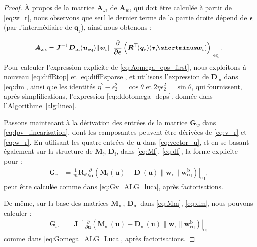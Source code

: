 \begin{proof}
À propos de la matrice $\boldsymbol{A}_{\omega \epsilon}$ de $\boldsymbol{A}_{w}$, qui doit être calculée à partir de \eqref{eq:w_r}, nous observons que seul le dernier terme de la partie droite dépend de $\boldsymbol{\epsilon}$ (par l'intermédiaire de $\boldsymbol{q}_{\mathrm r}$), ainsi nous obtenons :

\begin{align}
\label{eq:Aomega_eps_first}
\boldsymbol{A}_{ \omega \epsilon} =  \boldsymbol{J}^{-1}
\boldsymbol{D}_{\mathrm{m}} (\boldsymbol{u}_{\text{eq}}) \lVert  \boldsymbol{w}_{\mathrm{r}} \rVert 
\left. 
\frac{\partial }{\partial \boldsymbol{\epsilon}} \left( \boldsymbol{R}^\top \!(\boldsymbol{q}_{\mathrm{r}}) (\boldsymbol{v}_{\mathrm{r}} \! \shortminus \! \boldsymbol{w}_{\text{r}}) \right) \right|_{\mathrm{eq}}.
\end{align}
Pour calculer l'expression explicite de \eqref{eq:Aomega_eps_first}, nous exploitons à nouveau \eqref{eq:diffRtop} et \eqref{eq:diffRsparse}, et utilisons l'expression de $\boldsymbol{D}_{\mathrm{m}}$ dans \eqref{eq:dm}, ainsi que les identités $\overline \eta^2 - \overline \epsilon_2^2 = \cos \theta$ et $2\overline \eta \overline \epsilon_2^2 = \sin \theta$, qui fournissent, après simplifications, l'expression \eqref{eq:ddotomega_deps}, donnée dans l'Algorithme~\ref{alg:linea}.

Passons maintenant à la dérivation des entrées de la matrice $\boldsymbol{G}_{w}$ dans \eqref{eq:lpv_linearisation}, dont les composantes peuvent être dérivées de \eqref{eq:v_r} et \eqref{eq:w_r}. En utilisant les quatre entrées de $\boldsymbol{u}$ dans \eqref{eq:vector_u}, et en se basant également sur la structure de $\boldsymbol{M}_{\text{f}}$,
$\boldsymbol{D}_{\text{f}}$, dans \eqref{eq:Mf}, \eqref{eq:df}, la forme explicite pour :
\begin{align}
    \boldsymbol{G}_{v} \! &= \! 
    \frac{1}{m} \boldsymbol{R}_\theta \! \left.\frac{\partial}{\partial \boldsymbol{u}} \! 
     \left( \boldsymbol{M}_{\text{f}}(\boldsymbol{u}) \! - \! \boldsymbol{D}_{\text{f}}(\boldsymbol{u}) \lVert \boldsymbol{w}_{\text{r}} \rVert \boldsymbol{w}^{\text{b}}_{\mathrm{eq}}   \right)\right|_{\mathrm{eq}} ,
\end{align}
peut être calculée comme dans \eqref{eq:Gv_ALG_luca}, après factorisations. 

De même, sur la base des matrices $\boldsymbol{M}_{\text{m}}$, $\boldsymbol{D}_{\text{m}}$ dans \eqref{eq:Mm}, \eqref{eq:dm}, 
nous pouvons calculer : 
\begin{align}
     \boldsymbol{G}_{\omega} \! &= \!  \boldsymbol{J}^{-1} \! \left.\frac{\partial}{\partial \boldsymbol{u}} \! 
     \left( \boldsymbol{M}_{\text{m}}(\boldsymbol{u}) \! - \! \boldsymbol{D}_{\text{m}}(\boldsymbol{u}) \lVert \boldsymbol{w}_{\text{r}} \rVert \boldsymbol{w}^{\text{b}}_{\mathrm{eq}}   \right)\right|_{\mathrm{eq}}
\end{align}
comme dans \eqref{eq:Gomega_ALG_Luca}, après factorisations. 



\end{proof}
